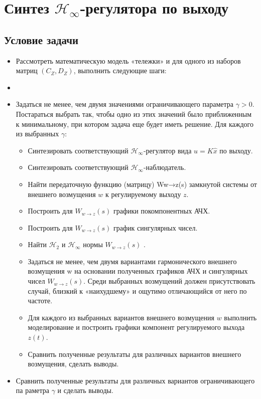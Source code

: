 \chapter{Синтез $\mathcal{H}_\infty$-регулятора по выходу}
\label{ch:chap5}
\section{Условие задачи}

\begin{itemize}
    \item  Рассмотреть математическую модель «тележки» и для одного из наборов матриц $(C_Z,D_Z)$, выполнить следующие шаги:
    \item \item  Задаться не менее, чем двумя значениями ограничивающего параметра $\gamma > 0$.
    Постараться выбрать так, чтобы одно из этих значений было приближенным к минимальному, при котором задача еще будет иметь решение. 
    Для каждого из выбранных $\gamma$:
    \begin{itemize}
        
        \item Синтезировать соответствующий $\mathcal{H}_\infty$-регулятор вида $u = K \hat{x}$ по выходу.
        \item Синтезировать соответствующий $\mathcal{H}_\infty$-наблюдатель.
        \item Найти передаточную функцию (матрицу) Ww→z(s) замкнутой системы от внешнего возмущения $w$ к регулируемому выходу $z$.
       \item Построить для $W_{w\rightarrow z}(s)$ графики покомпонентных АЧХ.
       \item Построить для $W_{w\rightarrow z}(s)$ график сингулярных чисел.
       \item Найти $\mathcal{H}_2$ и $\mathcal{H}_\infty$ нормы  $W_{w\rightarrow z}(s)$ .
       \item Задаться не менее, чем двумя вариантами гармонического внешнего возмущения
        w на основании полученных графиков АЧХ и сингулярных чисел $W_{w\rightarrow z}(s)$. 
        Среди выбранных возмущений должен присутствовать случай, близкий к «наихудшему» и ощутимо отличающийся от него по частоте.
        \item Для каждого из выбранных вариантов внешнего возмущения $w$ выполнить моделирование и построить графики компонент регулируемого выхода $z(t)$.
        \item Сравнить полученные результаты для различных вариантов внешнего возмущения, сделать выводы.
    \end{itemize}
    \item Сравнить полученные результаты для различных вариантов ограничивающего па
    раметра $\gamma$ и сделать выводы.
\end{itemize}

